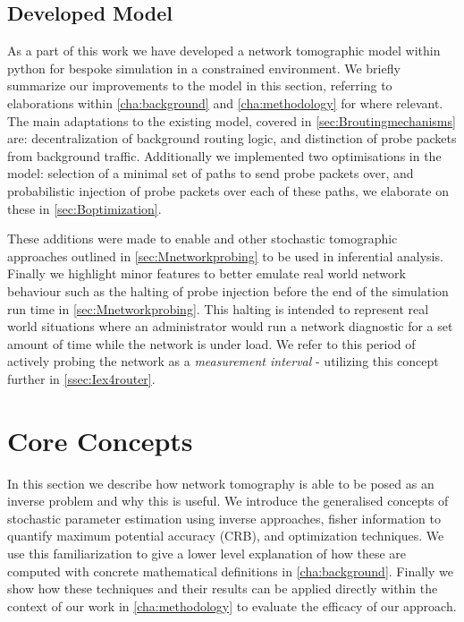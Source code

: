 \subsection{Developed Model}
\label{ssec:Idevelopedmodels}
As a part of this work we have developed a network tomographic model within python for bespoke simulation in a constrained environment. We briefly summarize our improvements to the model in this section, referring to elaborations within \cref{cha:background} and \cref{cha:methodology} for where relevant. The main adaptations to the existing model, covered in \cref{sec:Broutingmechanisms} are: decentralization of background routing logic, and distinction of probe packets from background traffic. Additionally we implemented two optimisations in the model: selection of a minimal set of paths to send probe packets over, and probabilistic injection of probe packets over each of these paths, we elaborate on these in \cref{sec:Boptimization}.\par
These additions were made to enable \pdv and other stochastic tomographic approaches outlined in \cref{sec:Mnetworkprobing} to be used in inferential analysis. Finally we highlight minor features to better emulate real world network behaviour such as the halting of probe injection before the end of the simulation run time in \cref{sec:Mnetworkprobing}. This halting is intended to represent real world situations where an administrator would run a network diagnostic for a set amount of time while the network is under load. We refer to this period of actively probing the network as a \textit{measurement interval} - utilizing this concept further in \cref{ssec:Iex4router}.

\newpage

\section{Core Concepts}
\label{sec:Icoreconcepts}

In this section we describe how network tomography is able to be posed as an inverse problem and why this is useful. We introduce the generalised concepts of stochastic parameter estimation using inverse approaches, fisher information to quantify maximum potential accuracy (CRB), and optimization techniques. We use this familiarization to give a lower level explanation of how these are computed with concrete mathematical definitions in \cref{cha:background}. Finally we show how these techniques and their results can be applied directly within the context of our work in \cref{cha:methodology} to evaluate the efficacy of our approach.

